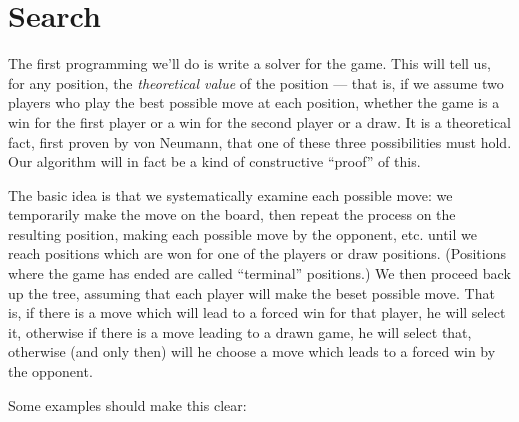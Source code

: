 \documentclass[10pt,dvipdfmx]{report}
\begin{document}
\section{Search}
The first programming we'll do is write a solver for the game.
This will tell us, for any position, the {\em theoretical value}
of the position  --- that is, if we assume two players who play
the best possible move at each position, whether the game is a win
for the first player or a win for the second player or a draw.
It is a theoretical fact, first proven by von Neumann, that one of
these three possibilities must hold.  Our algorithm will in fact be
a kind of constructive ``proof'' of this.

The basic idea is that we systematically examine each possible move:
we temporarily make the move on the board, then repeat the process
on the resulting position, making each possible move by the opponent,
etc. until we reach positions which are won for one of the players
or draw positions.  (Positions where the game has ended are called
``terminal'' positions.)  We then proceed back up the tree, assuming
that each player will make the beset possible move.  That is, if there
is a move which will lead to a forced win for that player,
he will select it, otherwise if there is a move leading to a drawn game,
he will select that, otherwise (and only then) will he choose a move
which leads to a forced win by the opponent.

Some examples should make this clear:
\end{document}
